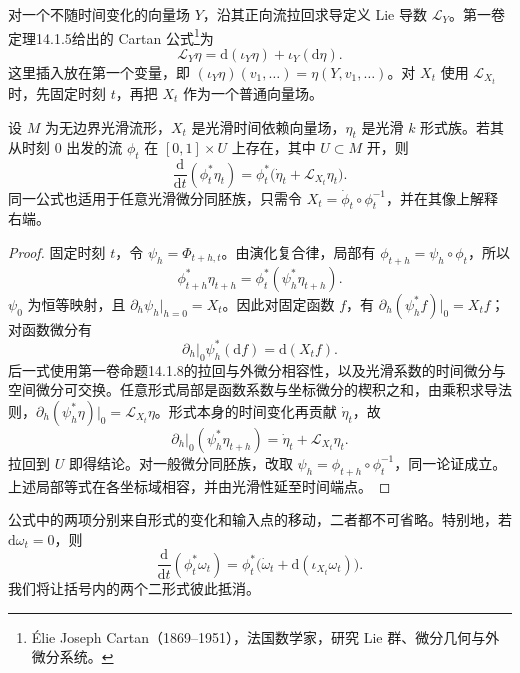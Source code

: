 \ProseParagraphBreak

对一个不随时间变化的向量场 \(Y\)，沿其正向流拉回求导定义 Lie 导数 \(\mathcal L_Y\)。第一卷定理14.1.5给出的 Cartan 公式\footnote{Élie Joseph Cartan（1869--1951），法国数学家，研究 Lie 群、微分几何与外微分系统。}为
\begin{equation}\label{g4:eq:0801:cartan}
	\mathcal L_Y\eta=\mathrm{d}(\iota_Y\eta)+\iota_Y(\mathrm{d}\eta).
\end{equation}
这里插入放在第一个变量，即 \((\iota_Y\eta)(v_1,\ldots)=\eta(Y,v_1,\ldots)\)。对 \(X_t\) 使用 \(\mathcal L_{X_t}\) 时，先固定时刻 \(t\)，再把 \(X_t\) 作为一个普通向量场。

\begin{proposition}\label{g4:prop:0801:pullback-derivative}
	设 \(M\) 为无边界光滑流形，\(X_t\) 是光滑时间依赖向量场，\(\eta_t\) 是光滑 \(k\) 形式族。若其从时刻 \(0\) 出发的流 \(\phi_t\) 在 \([0,1]\times U\) 上存在，其中 \(U\subset M\) 开，则
	\begin{equation}\label{g4:eq:0801:pullback-derivative}
		\frac{\mathrm{d}}{\mathrm{d}t}(\phi_t^*\eta_t)
		=\phi_t^*\bigl(\dot\eta_t+\mathcal L_{X_t}\eta_t\bigr).
	\end{equation}
	同一公式也适用于任意光滑微分同胚族，只需令 \(X_t=\dot\phi_t\circ\phi_t^{-1}\)，并在其像上解释右端。
\end{proposition}
\begin{proof}
	固定时刻 \(t\)，令 \(\psi_h=\Phi_{t+h,t}\)。由演化复合律，局部有 \(\phi_{t+h}=\psi_h\circ\phi_t\)，所以
	\[
		\phi_{t+h}^*\eta_{t+h}=\phi_t^*(\psi_h^*\eta_{t+h}).
	\]
	\(\psi_0\) 为恒等映射，且 \(\partial_h\psi_h|_{h=0}=X_t\)。因此对固定函数 \(f\)，有 \(\partial_h(\psi_h^*f)|_0=X_tf\)；对函数微分有
	\[
		\left.\partial_h\right|_0\psi_h^*(\mathrm{d}f)
		=\mathrm{d}(X_tf).
	\]
	后一式使用第一卷命题14.1.8的拉回与外微分相容性，以及光滑系数的时间微分与空间微分可交换。任意形式局部是函数系数与坐标微分的楔积之和，由乘积求导法则，\(\partial_h(\psi_h^*\eta)|_0=\mathcal L_{X_t}\eta\)。形式本身的时间变化再贡献 \(\dot\eta_t\)，故
	\[
		\left.\partial_h\right|_0(\psi_h^*\eta_{t+h})
		=\dot\eta_t+\mathcal L_{X_t}\eta_t.
	\]
	拉回到 \(U\) 即得结论。对一般微分同胚族，改取 \(\psi_h=\phi_{t+h}\circ\phi_t^{-1}\)，同一论证成立。上述局部等式在各坐标域相容，并由光滑性延至时间端点。
\end{proof}

公式中的两项分别来自形式的变化和输入点的移动，二者都不可省略。特别地，若 \(\mathrm{d}\omega_t=0\)，则
\begin{equation}\label{g4:eq:0801:closed-pullback-derivative}
	\frac{\mathrm{d}}{\mathrm{d}t}(\phi_t^*\omega_t)
	=\phi_t^*\bigl(\dot\omega_t+\mathrm{d}(\iota_{X_t}\omega_t)\bigr).
\end{equation}
我们将让括号内的两个二形式彼此抵消。

